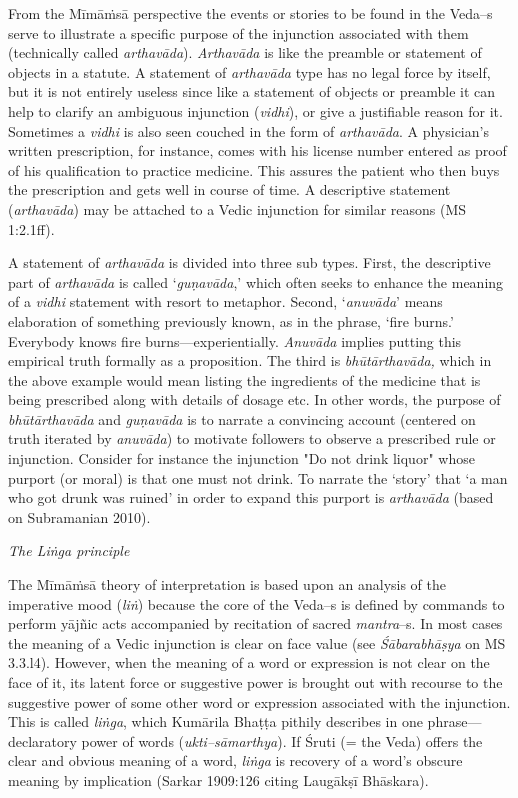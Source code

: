 From the Mīmāṁsā perspective the events or stories to be found in the Veda–s serve to illustrate a specific purpose of the injunction associated with them (technically called \textit{arthavāda}). \textit{Arthavāda} is like the preamble or statement of objects in a statute. A statement of \textit{arthavāda }type has no legal force by itself, but it is not entirely useless since like a statement of objects or preamble it can help to clarify an ambiguous injunction (\textit{vidhi}), or give a justifiable reason for it. Sometimes a \textit{vidhi} is also seen couched in the form of \textit{arthavāda}. A physician’s written prescription, for instance, comes with his license number entered as proof of his qualification to practice medicine. This assures the patient who then buys the prescription and gets well in course of time. A descriptive statement (\textit{arthavāda}) may be attached to a Vedic injunction for similar reasons (MS 1:2.1ff). 

A statement of \textit{arthavāda} is divided into three sub types. First, the descriptive part of \textit{arthavāda} is called ‘\textit{guṇavāda},’ which often seeks to enhance the meaning of a \textit{vidhi }statement with resort to metaphor. Second, ‘\textit{anuvāda}’ means elaboration of something previously known, as in the phrase, ‘fire burns.’ Everybody knows fire burns—experientially. \textit{Anuvāda} implies putting this empirical truth formally as a proposition. The third is \textit{bhūtārthavāda, }which in the above example would mean listing the ingredients of the medicine that is being prescribed along with details of dosage etc. In other words, the purpose of \textit{bhūtārthavāda} and \textit{guṇavāda }is to narrate a convincing account (centered on truth iterated by \textit{anuvāda}) to motivate followers to observe a prescribed rule or injunction. Consider for instance the injunction "Do not drink liquor" whose purport (or moral) is that one must not drink. To narrate the ‘story’ that ‘a man who got drunk was ruined’ in order to expand this purport is \textit{arthavāda }(based on Subramanian 2010).

\textit{The Liṅga principle}

The Mīmāṁsā theory of interpretation is based upon an analysis of the imperative mood (\textit{liṅ}) because the core of the Veda–s is defined by commands to perform yājñic acts accompanied by recitation of sacred \textit{mantra}–s. In most cases the meaning of a Vedic injunction is clear on face value (see \textit{Śābarabhāṣya} on MS 3.3.l4). However, when the meaning of a word or expression is not clear on the face of it, its latent force or suggestive power is brought out with recourse to the suggestive power of some other word or expression associated with the injunction. This is called \textit{liṅga}, which Kumārila Bhaṭṭa pithily describes in one phrase—declaratory power of words (\textit{ukti–sāmarthya}). If Śruti (= the Veda) offers the clear and obvious meaning of a word, \textit{liṅga} is recovery of a word’s obscure meaning by implication (Sarkar 1909:126 citing Laugākṣī Bhāskara).

